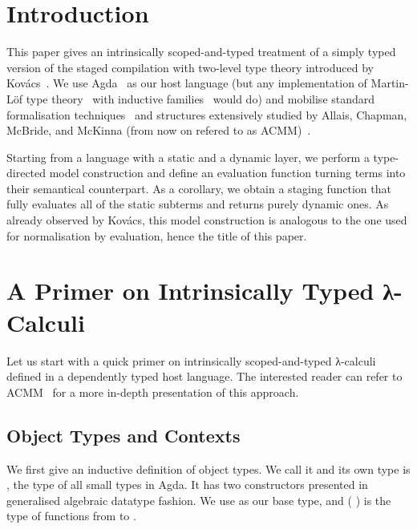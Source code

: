 \section{Introduction}

This paper gives an intrinsically scoped-and-typed
treatment of a simply typed version of the staged compilation
with two-level type theory introduced by
Kov{\'{a}}cs~\cite{DBLP:journals/pacmpl/Kovacs22}.
%
We use Agda~\cite{DBLP:conf/afp/Norell08}
as our host language (but any implementation
of Martin-Löf type theory~\cite{DBLP:books/daglib/0000395}
with inductive families~\cite{DBLP:journals/fac/Dybjer94}
would do)
and mobilise standard formalisation
techniques~\cite{DBLP:journals/lisp/Coquand02, DBLP:journals/jar/BentonHKM12}
and structures extensively studied by Allais, Chapman,
McBride, and McKinna (from now on refered to as ACMM)~\cite{DBLP:conf/cpp/Allais0MM17}.

Starting from a language with a static and a dynamic layer,
we perform a type-directed model construction
and define an evaluation function turning terms
into their semantical counterpart.
%
As a corollary, we obtain a staging function that
fully evaluates all of the static subterms and returns
purely dynamic ones.
%
As already observed by Kov{\'{a}}cs, this model construction
is analogous to the one used for normalisation by evaluation,
hence the title of this paper.


\section{A Primer on Intrinsically Typed λ-Calculi}\label{sec:intrinsictyping}

Let us start with a quick primer on intrinsically scoped-and-typed λ-calculi
defined in a dependently typed host language. The interested reader
can refer to ACMM~\cite{DBLP:conf/cpp/Allais0MM17} for a more in-depth
presentation of this approach.

\subsection{Object Types and Contexts}

We first give an inductive definition of object types.
We call it  and its own type is ,
the type of all small types in Agda.
It has two constructors presented in generalised algebraic
datatype fashion.
We use  as our base type,
and (  ) is the type of functions from
 to .

